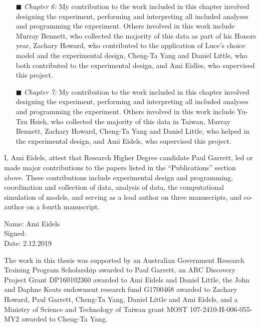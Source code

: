\documentclass[12pt,oneside]{Thesis}
\begin{document}
{\begin{itemize}
\item[\tiny{$\blacksquare$}] \emph{Chapter 6:} My contribution to the work included in this chapter involved designing the experiment, performing and interpreting all included analyses and programming the experiment. Others involved in this work include Murray Bennett, who collected the majority of this data as part of his Honors year, Zachary Howard, who contributed to the application of Luce's choice model and the experimental design, Cheng-Ta Yang and Daniel Little, who both contributed to the experimental design, and Ami Eidles, who supervised this project. 

\item[\tiny{$\blacksquare$}] \emph{Chapter 7:} My contribution to the work included in this chapter involved designing the experiment, performing and interpreting all included analyses and programming the experiment. Others involved in this work include Yu-Tzu Hsieh, who collected the majority of this data in Taiwan, Murray Bennett, Zachary Howard, Cheng-Ta Yang and Daniel Little, who helped in the experimental design, and Ami Eidels, who supervised this project.

\end{itemize} 
}

\clearpage
I, Ami Eidels, attest that Research Higher Degree candidate Paul Garrett, led or made major contributions to the papers listed in the ``Publications'' section above. These contributions include experimental design and programming, coordination and collection of data, analysis of data, the computational simulation of models, and serving as a lead author on three manuscripts, and co-author on a fourth manuscript.\\

\begin{minipage}{0.4\textwidth}
\begin{flushleft} \large
Name: Ami Eidels\\
\vspace{1em}
Signed:  
\\
\vspace{1em}
Date:
2.12.2019 \\
\end{flushleft}
\end{minipage}

\vspace*{\fill}

The work in this thesis was supported by an Australian Government Research Training Program Scholarship awarded to Paul Garrett, an ARC Discovery Project Grant DP160102360 awarded to Ami Eidels and Daniel Little, the John and Daphne Keats endowment research fund G1700468 awarded to Zachary Howard, Paul Garrett, Cheng-Ta Yang, Daniel Little and Ami Eidels, and a Ministry of Science and Technology of Taiwan grant MOST 107-2410-H-006-055-MY2 awarded to Cheng-Ta Yang.
\end{document}

